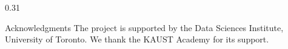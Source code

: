 \documentclass[final]{beamer}
\begin{document}
\begin{frame}[t]
\begin{columns}[t]
\begin{column}{0.31\paperwidth}
\begin{block}{Acknowledgments}
The \ProjectName{} project is supported by the Data Sciences Institute,
University of Toronto. We thank the KAUST Academy for its support.
\end{block}

\end{column}

\end{columns}

\end{frame}
\end{document}
